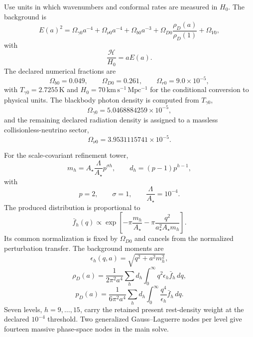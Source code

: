 Use units in which wavenumbers and conformal rates are measured in $H_0$.  The background is
\begin{equation}
 E(a)^2
 =\Omega_{\gamma0}a^{-4}
 +\Omega_{\nu0}a^{-4}
 +\Omega_{b0}a^{-3}
 +\Omega_{D0}\frac{\rho_D(a)}{\rho_D(1)}
 +\Omega_{V0},
 \label{eq:pcmb-background}
\end{equation}
with
\begin{equation}
 \frac{\mathcal H}{H_0}=aE(a).
 \label{eq:pcmb-conformal-hubble}
\end{equation}
The declared numerical fractions are
\begin{equation}
 \Omega_{b0}=0.049,
 \qquad
 \Omega_{D0}=0.261,
 \qquad
 \Omega_{r0}=9.0\times10^{-5},
 \label{eq:pcmb-density-inputs}
\end{equation}
with $T_{\gamma0}=2.7255\,\mathrm K$ and $H_0=70\,\mathrm{km\,s^{-1}\,Mpc^{-1}}$ for the conditional conversion to physical units.  The blackbody photon density is computed from $T_{\gamma0}$,
\begin{equation}
 \Omega_{\gamma0}=5.0468884259\times10^{-5},
 \label{eq:pcmb-photon-density}
\end{equation}
and the remaining declared radiation density is assigned to a massless collisionless-neutrino sector,
\begin{equation}
 \Omega_{\nu0}=3.9531115741\times10^{-5}.
 \label{eq:pcmb-neutrino-density}
\end{equation}

For the scale-covariant refinement tower,
\begin{equation}
 m_h=A_{\star}\frac{\Lambda}{A_{\star}}p^{\sigma h},
 \qquad
 d_h=(p-1)p^{h-1},
 \label{eq:pcmb-level-spectrum}
\end{equation}
with
\begin{equation}
 p=2,
 \qquad
 \sigma=1,
 \qquad
 \frac{\Lambda}{A_{\star}}=10^{-4}.
 \label{eq:pcmb-dark-parameters}
\end{equation}
The produced distribution is proportional to
\begin{equation}
 \bar f_h(q)
 \propto
 \exp\left[-\pi\frac{m_h}{A_{\star}}
 -\pi\frac{q^2}{a_{\star}^2A_{\star}m_h}\right].
 \label{eq:pcmb-dark-distribution}
\end{equation}
Its common normalization is fixed by $\Omega_{D0}$ and cancels from the normalized perturbation transfer.  The background moments are
\begin{equation}
 \epsilon_h(q,a)=\sqrt{q^2+a^2m_h^2},
 \label{eq:pcmb-dark-energy}
\end{equation}
\begin{equation}
 \rho_D(a)
 =\frac{1}{2\pi^2a^4}
 \sum_h d_h\int_0^\infty q^2\epsilon_h\bar f_h\,dq,
 \label{eq:pcmb-dark-density}
\end{equation}
\begin{equation}
 p_D(a)
 =\frac{1}{6\pi^2a^4}
 \sum_h d_h\int_0^\infty\frac{q^4}{\epsilon_h}\bar f_h\,dq.
 \label{eq:pcmb-dark-pressure}
\end{equation}
Seven levels, $h=9,\ldots,15$, carry the retained present rest-density weight at the declared $10^{-4}$ threshold.  Two generalized Gauss--Laguerre nodes per level give fourteen massive phase-space nodes in the main solve.

